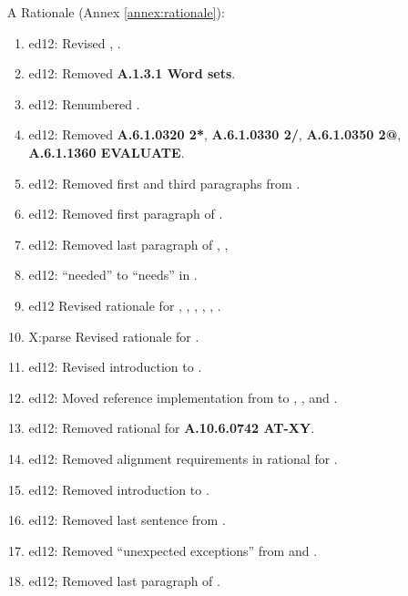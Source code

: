 \begin{itemize}
	\item[A] Rationale (Annex \ref{annex:rationale}):				%
		\begin{enumerate}
		\item \textsf{ed12}: Revised , .
		\item \textsf{ed12}: Removed \textbf{A.1.3.1 Word sets}.
		\item \textsf{ed12}: Renumbered .
		\item \textsf{ed12}: Removed
			\textbf{A.6.1.0320 2*},
			\textbf{A.6.1.0330 2/},
			\textbf{A.6.1.0350 2@},
			\textbf{A.6.1.1360 EVALUATE}.
		\item \textsf{ed12}: Removed first and third paragraphs from .
		\item \textsf{ed12}: Removed first paragraph of .
		\item \textsf{ed12}: Removed last paragraph of ,
			,
		\item \textsf{ed12}: ``needed'' to ``needs'' in .
		\item \textsf{ed12} Revised rationale for ,
			, , ,
			, .
		\item \textsf{X:parse} Revised rationale for .
		\item \textsf{ed12}: Revised introduction to .
		\item \textsf{ed12}: Moved reference implementation from
			 to \linebreak {}, ,
			 and .
		\item \textsf{ed12}: Removed rational for \textbf{A.10.6.0742 AT-XY}.
		\item \textsf{ed12}: Removed alignment requirements in rational for
			.
		\item \textsf{ed12}: Removed introduction to .
		\item \textsf{ed12}: Removed last sentence from .
		\item \textsf{ed12}: Removed ``unexpected exceptions'' from
			 and .
		\item \textsf{ed12}; Removed last paragraph of .

\end{enumerate}
\end{itemize}
